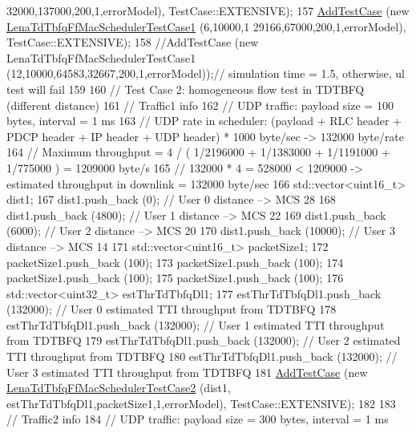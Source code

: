 \begin{DoxyCode}
      32000,137000,200,1,errorModel), TestCase::EXTENSIVE);
157   \hyperlink{classns3_1_1TestCase_a3718088e3eefd5d6454569d2e0ddd835}{AddTestCase} (\textcolor{keyword}{new} \hyperlink{classLenaTdTbfqFfMacSchedulerTestCase1}{LenaTdTbfqFfMacSchedulerTestCase1} (6,10000,1
      29166,67000,200,1,errorModel), TestCase::EXTENSIVE);
158   \textcolor{comment}{//AddTestCase (new LenaTdTbfqFfMacSchedulerTestCase1 (12,10000,64583,32667,200,1,errorModel));//
       simulation time = 1.5, otherwise, ul test will fail}
159 
160   \textcolor{comment}{// Test Case 2: homogeneous flow test in TDTBFQ (different distance)}
161   \textcolor{comment}{// Traffic1 info}
162   \textcolor{comment}{//   UDP traffic: payload size = 100 bytes, interval = 1 ms}
163   \textcolor{comment}{//   UDP rate in scheduler: (payload + RLC header + PDCP header + IP header + UDP header) * 1000 byte/sec
       -> 132000 byte/rate }
164   \textcolor{comment}{// Maximum throughput = 4 / ( 1/2196000 + 1/1383000 + 1/1191000 + 1/775000 ) = 1209000 byte/s}
165   \textcolor{comment}{// 132000 * 4 = 528000 < 1209000 -> estimated throughput in downlink = 132000 byte/sec}
166   std::vector<uint16\_t> dist1;
167   dist1.push\_back (0);       \textcolor{comment}{// User 0 distance --> MCS 28}
168   dist1.push\_back (4800);    \textcolor{comment}{// User 1 distance --> MCS 22}
169   dist1.push\_back (6000);    \textcolor{comment}{// User 2 distance --> MCS 20}
170   dist1.push\_back (10000);   \textcolor{comment}{// User 3 distance --> MCS 14}
171   std::vector<uint16\_t> packetSize1;
172   packetSize1.push\_back (100);
173   packetSize1.push\_back (100);
174   packetSize1.push\_back (100);
175   packetSize1.push\_back (100);
176   std::vector<uint32\_t> estThrTdTbfqDl1;
177   estThrTdTbfqDl1.push\_back (132000); \textcolor{comment}{// User 0 estimated TTI throughput from TDTBFQ}
178   estThrTdTbfqDl1.push\_back (132000); \textcolor{comment}{// User 1 estimated TTI throughput from TDTBFQ}
179   estThrTdTbfqDl1.push\_back (132000); \textcolor{comment}{// User 2 estimated TTI throughput from TDTBFQ}
180   estThrTdTbfqDl1.push\_back (132000); \textcolor{comment}{// User 3 estimated TTI throughput from TDTBFQ}
181   \hyperlink{classns3_1_1TestCase_a3718088e3eefd5d6454569d2e0ddd835}{AddTestCase} (\textcolor{keyword}{new} \hyperlink{classLenaTdTbfqFfMacSchedulerTestCase2}{LenaTdTbfqFfMacSchedulerTestCase2} (dist1,
      estThrTdTbfqDl1,packetSize1,1,errorModel), TestCase::EXTENSIVE);
182 
183   \textcolor{comment}{// Traffic2 info}
184   \textcolor{comment}{//   UDP traffic: payload size = 300 bytes, interval = 1 ms}

\end{DoxyCode}
